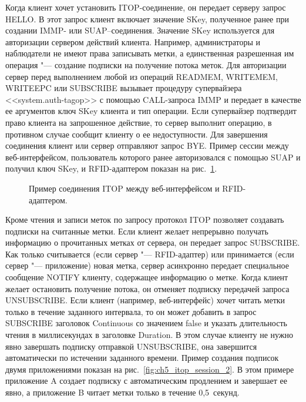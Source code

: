 Когда клиент хочет установить ITOP-соединение, он передает серверу запрос HELLO. В этот запрос клиент включает значение SKey, полученное ранее при создании IMMP- или SUAP--соединения. Значение SKey используется для авторизации сервером действий клиента. Например, администраторы и наблюдатели не имеют права записывать метки, а единственная разрешенная им операция "--- создание подписки на получение потока меток. Для авторизации сервер перед выполнением любой из операций READMEM, WRITEMEM, WRITEEPC или SUBSCRIBE вызывает процедуру супервайзера <<system.auth-tagop>> с помощью CALL-запроса IMMP и передает в качестве ее аргументов ключ SKey клиента и тип операции. Если супервайзер подтвердит право клиента на запрошенное действие, то сервер выполнит операцию, в противном случае сообщит клиенту о ее недоступности. Для завершения соединения клиент или сервер отправляют запрос BYE. Пример сессии между веб-интерфейсом, пользователь которого ранее авторизовался с помощью SUAP и получил ключ SKey, и RFID-адаптером показан на рис.~\ref{fig:ch5_itop_session_1}.

\begin{figure}[ht]
  \caption{Пример соединения ITOP между веб-интерфейсом и RFID-адаптером.}
  \label{fig:ch5_itop_session_1}
\end{figure}

Кроме чтения и записи меток по запросу протокол ITOP позволяет создавать подписки на считанные метки. Если клиент желает непрерывно получать информацию о прочитанных метках от сервера, он передает запрос SUBSCRIBE. Как только считывается (если сервер "--- RFID-адаптер) или принимается (если сервер "--- приложение) новая метка, сервер асинхронно передает специальное сообщение NOTIFY клиенту, содержащее информацию о метке. Когда клиент желает остановить получение потока, он отменяет подписку передачей запроса UNSUBSCRIBE. Если клиент (например, веб-интерфейс) хочет читать метки только в течение заданного интервала, то он может добавить в запрос SUBSCRIBE заголовок Continuous со значением false и указать длительность чтения в миллисекундах в заголовке Duration. В этом случае клиенту не нужно явно завершать подписку отправкой UNSUBSCRIBE, она завершится автоматически по истечении заданного времени. Пример создания подписок двумя приложениями показан на рис.~\ref{fig:ch5_itop_session_2}. В этом примере приложение A создает подписку с автоматическим продлением и завершает ее явно, а приложение B читает метки только в течение 0,5~секунд.

